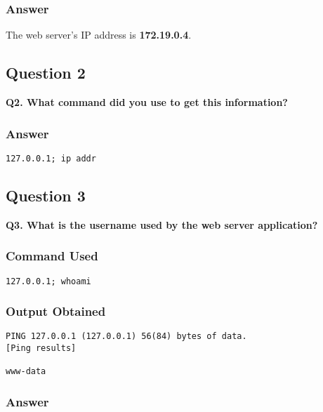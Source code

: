 \documentclass[12pt]{article}
\begin{document}
\subsubsection{Answer}

The web server's IP address is \textbf{172.19.0.4}.

\subsection{Question 2}

\textbf{Q2. What command did you use to get this information?}

\subsubsection{Answer}



\begin{lstlisting}[style=terminal]
127.0.0.1; ip addr
\end{lstlisting}

\subsection{Question 3}

\textbf{Q3. What is the username used by the web server application?}

\subsubsection{Command Used}

\begin{lstlisting}[style=terminal]
127.0.0.1; whoami
\end{lstlisting}

\subsubsection{Output Obtained}

\begin{lstlisting}[style=terminal]
PING 127.0.0.1 (127.0.0.1) 56(84) bytes of data.
[Ping results]

www-data
\end{lstlisting}

\subsubsection{Answer}
\end{document}

